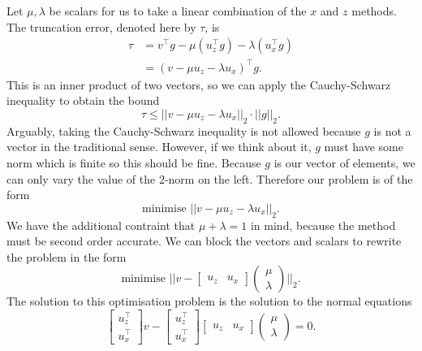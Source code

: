 Let $\mu, \lambda$ be scalars for us to take a linear combination of the $x$ and $z$ methods.
The truncation error, denoted here by $\tau$, is
\begin{align*}
    \tau &= v^\top g - \mu ( u_z^\top g ) - \lambda ( u_x^\top g ) \\
    &= \left( v - \mu u_z - \lambda u_x \right)^\top g.
\end{align*}
This is an inner product of two vectors, so we can apply the Cauchy-Schwarz inequality to obtain the bound
\begin{equation*}
    \tau \leq ||v - \mu u_z - \lambda u_x||_2 \cdot ||g||_2.
\end{equation*}
Arguably, taking the Cauchy-Schwarz inequality is not allowed because $g$ is not a vector in the traditional sense.
However, if we think about it, $g$ must have some norm which is finite so this should be fine. %
Because $g$ is our vector of elements, we can only vary the value of the $2$-norm on the left.
Therefore our problem is of the form
\begin{equation*}
    \text{minimise } ||v - \mu u_z - \lambda u_x||_2.
\end{equation*}
We have the additional contraint that $\mu + \lambda = 1$ in mind, because the method must be second order accurate.
We can block the vectors and scalars to rewrite the problem in the form
\begin{equation*}
    \text{minimise } ||v - \begin{bmatrix}
        u_z & u_x
    \end{bmatrix} \begin{pmatrix}
        \mu \\
        \lambda
    \end{pmatrix}||_2.
\end{equation*}
The solution to this optimisation problem \cite{boyd2004convex} is the solution to the normal equations
\begin{equation*}
    \begin{bmatrix}
        u_z^\top \\
        u_x^\top
    \end{bmatrix} v - \begin{bmatrix}
        u_z^\top \\
        u_x^\top
    \end{bmatrix} \begin{bmatrix}
        u_z & u_x
    \end{bmatrix} \begin{pmatrix}
        \mu \\
        \lambda
    \end{pmatrix} = 0.
\end{equation*}
